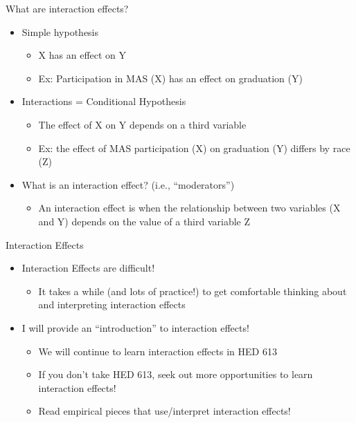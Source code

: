 \documentclass[8pt,ignorenonframetext,dvipsnames]{beamer}
\providecommand{\tightlist}{%
  \setlength{\itemsep}{0pt}\setlength{\parskip}{0pt}}
\let\olditem\item
\renewcommand{\item}{%
  \olditem\vspace{4pt}
}
\begin{document}
\begin{frame}{What are interaction effects?}
\protect\hypertarget{what-are-interaction-effects}{}

\begin{itemize}
\tightlist
\item
  Simple hypothesis

  \begin{itemize}
  \tightlist
  \item
    X has an effect on Y
  \item
    Ex: Participation in MAS (X) has an effect on graduation (Y)
  \end{itemize}
\item
  Interactions = Conditional Hypothesis

  \begin{itemize}
  \tightlist
  \item
    The effect of X on Y depends on a third variable
  \item
    Ex: the effect of MAS participation (X) on graduation (Y) differs by
    race (Z)
  \end{itemize}
\item
  What is an interaction effect? (i.e., ``moderators'')

  \begin{itemize}
  \tightlist
  \item
    An interaction effect is when the relationship between two variables
    (X and Y) depends on the value of a third variable Z
  \end{itemize}
\end{itemize}

\end{frame}

\begin{frame}{Interaction Effects}
\protect\hypertarget{interaction-effects}{}

\begin{itemize}
\tightlist
\item
  Interaction Effects are difficult!

  \begin{itemize}
  \tightlist
  \item
    It takes a while (and lots of practice!) to get comfortable thinking
    about and interpreting interaction effects
  \end{itemize}
\item
  I will provide an ``introduction'' to interaction effects!

  \begin{itemize}
  \tightlist
  \item
    We will continue to learn interaction effects in HED 613
  \item
    If you don't take HED 613, seek out more opportunities to learn
    interaction effects!
  \item
    Read empirical pieces that use/interpret interaction effects!
  \end{itemize}
\end{itemize}

\end{frame}
\end{document}
